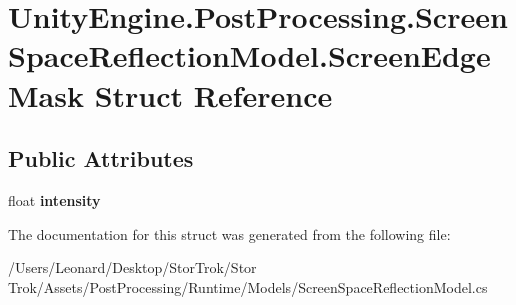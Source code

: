 \hypertarget{struct_unity_engine_1_1_post_processing_1_1_screen_space_reflection_model_1_1_screen_edge_mask}{}\section{Unity\+Engine.\+Post\+Processing.\+Screen\+Space\+Reflection\+Model.\+Screen\+Edge\+Mask Struct Reference}
\label{struct_unity_engine_1_1_post_processing_1_1_screen_space_reflection_model_1_1_screen_edge_mask}
\subsection*{Public Attributes}
\begin{DoxyCompactItemize}
\item 
\mbox{\label{struct_unity_engine_1_1_post_processing_1_1_screen_space_reflection_model_1_1_screen_edge_mask_a2b7c55a5cf534281a9e4acd398ecf805}} 
float {\bfseries intensity}
\end{DoxyCompactItemize}


The documentation for this struct was generated from the following file\+:\begin{DoxyCompactItemize}
\item 
/\+Users/\+Leonard/\+Desktop/\+Stor\+Trok/\+Stor Trok/\+Assets/\+Post\+Processing/\+Runtime/\+Models/Screen\+Space\+Reflection\+Model.\+cs\end{DoxyCompactItemize}
